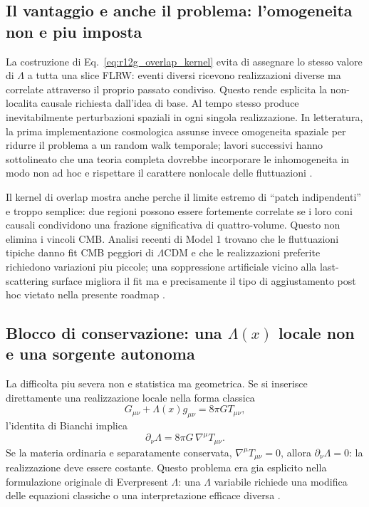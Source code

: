 \documentclass[11pt,a4paper]{article}
\begin{document}
\subsection{Il vantaggio e anche il problema: l'omogeneita non e piu imposta}

La costruzione di Eq.~\eqref{eq:r12g_overlap_kernel} evita di assegnare lo stesso valore di $\Lambda$ a tutta una slice FLRW: eventi diversi ricevono realizzazioni diverse ma correlate attraverso il proprio passato condiviso. Questo rende esplicita la non-localita causale richiesta dall'idea di base. Al tempo stesso produce inevitabilmente perturbazioni spaziali in ogni singola realizzazione. In letteratura, la prima implementazione cosmologica assunse invece omogeneita spaziale per ridurre il problema a un random walk temporale; lavori successivi hanno sottolineato che una teoria completa dovrebbe incorporare le inhomogeneita in modo non ad hoc e rispettare il carattere nonlocale delle fluttuazioni \cite{AhmedEtAl2004,AhmedSorkin2012,ZwaneAfshordiSorkin2017}.

Il kernel di overlap mostra anche perche il limite estremo di ``patch indipendenti'' e troppo semplice: due regioni possono essere fortemente correlate se i loro coni causali condividono una frazione significativa di quattro-volume. Questo non elimina i vincoli CMB. Analisi recenti di Model 1 trovano che le fluttuazioni tipiche danno fit CMB peggiori di $\Lambda$CDM e che le realizzazioni preferite richiedono variazioni piu piccole; una soppressione artificiale vicino alla last-scattering surface migliora il fit ma e precisamente il tipo di aggiustamento post hoc vietato nella presente roadmap \cite{DasNasiriYazdi2023}.

\subsection{Blocco di conservazione: una $\Lambda(x)$ locale non e una sorgente autonoma}

La difficolta piu severa non e statistica ma geometrica. Se si inserisce direttamente una realizzazione locale nella forma classica
\begin{equation}
 G_{\mu\nu}+\Lambda(x)g_{\mu\nu}=8\pi G T_{\mu\nu},
 \label{eq:r12g_local_lambda_einstein}
\end{equation}
l'identita di Bianchi implica
\begin{equation}
 \boxed{
 \partial_\nu\Lambda=8\pi G\,\nabla^\mu T_{\mu\nu}.
 }
 \label{eq:r12g_bianchi_exchange}
\end{equation}
Se la materia ordinaria e separatamente conservata, $\nabla^\mu T_{\mu\nu}=0$, allora $\partial_\nu\Lambda=0$: la realizzazione deve essere costante. Questo problema era gia esplicito nella formulazione originale di Everpresent $\Lambda$: una $\Lambda$ variabile richiede una modifica delle equazioni classiche o una interpretazione efficace diversa \cite{AhmedEtAl2004,AhmedSorkin2012}.
\end{document}
